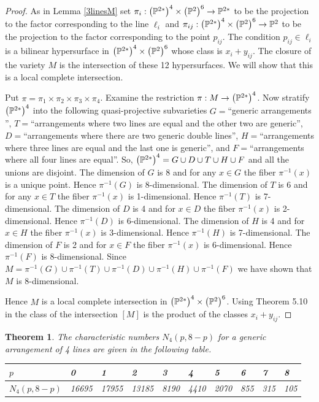 \documentclass[12pt]{article}
\theoremstyle{plain}
\newtheorem{theorem}{Theorem}
\theoremstyle{definition}
\newcommand{\N}{N}
\renewcommand{\P}{\ensuremath \mathbb{P}}
\begin{document}
\begin{proof}

As in Lemma \ref{3linesM} set $\pi_i : \left( \P^{2*}\right)^4 \times \left( \P^2 \right)^6\to \P^{2*}$ to be the projection to the factor corresponding to the line $\ell_i$ and $\pi_{ij} : \left( \P^{2*}\right)^4 \times \left( \P^2 \right)^6\to \P^{2}$ to be the projection to the factor corresponding to the point $p_{ij}$. The condition $p_{ij}\in \ell_i$ is a bilinear hypersurface in $\left( \P^{2*}\right)^{4}\times \left( \P^{2}\right)^{6}$ whose class is $x_i+y_{ij}$. The closure of the variety $M$ is the intersection of these 12 hypersurfaces.  We will show that this is a local complete intersection.

Put $\pi=\pi_1\times \pi_2\times \pi_3\times \pi_4$. Examine the restriction $\pi :M \to \left(\P^{2*}\right)^4$. Now stratify $\left(\P^{2*}\right)^4$ into the following quasi-projective subvarieties $G=$``generic arrangements '', $T=$``arrangements where two lines are equal and the other two are generic'', $D=$``arrangements where there are two generic double lines'', $H=$``arrangements where three lines are equal and the last one is generic'', and $F=$``arrangements where all four lines are equal''. So, $\left(\P^{2*}\right)^4=G\cup D\cup T\cup H\cup F$ and all the unions are disjoint. The dimension of $G$ is 8 and for any $x\in G$ the fiber  $\pi^{-1}(x)$ is a unique point. Hence  $\pi^{-1}(G)$ is 8-dimensional. The dimension of $T$ is 6 and for any $x\in T$ the fiber  $\pi^{-1}(x)$ is 1-dimensional. Hence $\pi^{-1}(T)$ is 7-dimensional. The dimension of $D$ is 4 and for $x\in D$ the fiber  $\pi^{-1}(x)$ is 2-dimensional. Hence $\pi^{-1}(D)$ is 6-dimensional. The dimension of $H$ is 4 and for $x\in H$ the fiber  $\pi^{-1}(x)$ is 3-dimensional. Hence  $\pi^{-1}(H)$ is 7-dimensional. The dimension of $F$ is 2 and for $x\in F$ the fiber  $\pi^{-1}(x)$ is 6-dimensional. Hence  $\pi^{-1}(F)$ is 8-dimensional. Since $M=\pi^{-1}(G)\cup\pi^{-1}(T)\cup\pi^{-1}(D)\cup\pi^{-1}(H)\cup\pi^{-1}(F)$ we have shown that $M$ is 8-dimensional. 

Hence $M$ is a local complete intersection in $\left( \P^{2*}\right)^4 \times \left( \P^2 \right)^6$. Using Theorem 5.10 in \cite{EH} the class of the intersection $[M]$ is the product of the classes $x_i+y_{ij}$.
\end{proof}

\begin{theorem} \label{cn4}
The characteristic numbers $\N_4(p,8-p)$ for a generic arrangement
of 4 lines are given in the following table.

\begin{center}
\begin{tabular}{|l||l|l|l|l|l|l|l|l|l|}
\hline $p$ & 0 & 1 & 2 & 3 & 4 & 5 & 6 & 7 & 8 \\ \hline 

$\N_4(p,8-p)$ 
& 16695 & 17955 & 13185 & 8190 & 4410 & 2070 & 855 & 315 & 105  
\\ \hline
\end{tabular}
\end{center}

\end{theorem}
\end{document}

